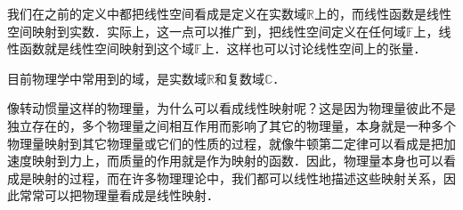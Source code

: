 我们在之前的定义中都把线性空间看成是定义在实数域$\mathbb{R}$上的，而线性函数是线性空间映射到实数．实际上，这一点可以推广到，把线性空间定义在任何域$\mathbb{F}$上，线性函数就是线性空间映射到这个域$\mathbb{F}$上．这样也可以讨论线性空间上的张量．

目前物理学中常用到的域，是实数域$\mathbb{R}$和复数域$\mathbb{C}$．

像转动惯量这样的物理量，为什么可以看成线性映射呢？这是因为物理量彼此不是独立存在的，多个物理量之间相互作用而影响了其它的物理量，本身就是一种多个物理量映射到其它物理量或它们的性质的过程，就像牛顿第二定律可以看成是把加速度映射到力上，而质量的作用就是作为映射的函数．因此，物理量本身也可以看成是映射的过程，而在许多物理理论中，我们都可以线性地描述这些映射关系，因此常常可以把物理量看成是线性映射．







